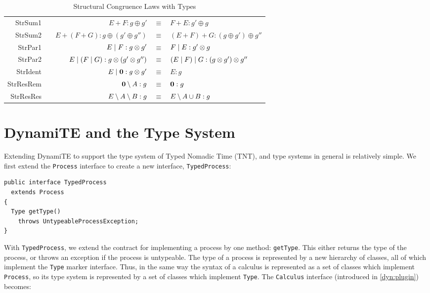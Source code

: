 \begin{table}
 \caption{Structural Congruence Laws with Types}
 \label{tab:typedstructcong}
  \shrule \centering
  \begin{tabular}{rcrcl}
  StrSum1 & \quad\quad &  
  $E + F : g \oplus g'$              & $\equiv$ & $F + E : g' \oplus g$
\\
  StrSum2 &&  
  $E + (F + G) : g \oplus (g' \oplus g'')$        & $\equiv$ & $(E + F) + G : (g \oplus g') \oplus g''$
\\
  StrPar1 &&  
  $E \;|\; F : g \otimes g'$            & $\equiv$ & $F \;|\; E : g' \otimes g$
\\
  StrPar2 &&  
  $E \;|\; (F \;|\; G) : g \otimes (g' \otimes g'')$    & $\equiv$ & $(E \;|\; F) \;|\; G : (g \otimes g') \otimes g''$
\\
  StrIdent &&  
  $E \;|\; \textbf{0} : g \otimes g'$         & $\equiv$ & $E : g$
\\
  StrResRem &&  
  $\textbf{0} \setminus {A} : g$       & $\equiv$ & $\textbf{0} : g$
\\
  StrResRes &&  
  $E \setminus {A} \setminus {B} : g$  & $\equiv$ & $E \setminus {A \cup B} : g$
  \end{tabular}
  \shrule
\end{table}

\section{DynamiTE and the Type System}
\label{dyn:type}

Extending DynamiTE to support the type system of Typed Nomadic Time
(TNT), and type systems in general is relatively simple.  We first
extend the \texttt{Process} interface to create a new interface,
\texttt{TypedProcess}:

\begin{verbatim}
public interface TypedProcess
  extends Process
{
  Type getType()
    throws UntypeableProcessException;
}
\end{verbatim}

With \texttt{TypedProcess}, we extend the contract for implementing a
process by one method: \texttt{getType}.  This either returns the type
of the process, or throws an exception if the process is untypeable.
The type of a process is represented by a new hierarchy of classes,
all of which implement the \texttt{Type} marker interface.  Thus, in
the same way the syntax of a calculus is represented as a set of
classes which implement \texttt{Process}, so its type system is
represented by a set of classes which implement \texttt{Type}.  The
\texttt{Calculus} interface (introduced in \ref{dyn:plugin}) becomes:

